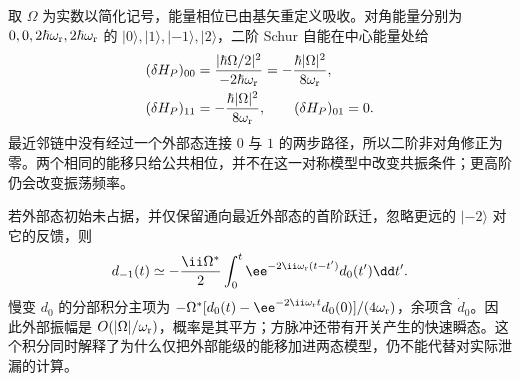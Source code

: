 \begin{derivation}[消去最近外部通道产生什么修正]
取 $\Omega$ 为实数以简化记号，能量相位已由基矢重定义吸收。对角能量分别为 $0,0,2\hbar\omega_{\rm r},2\hbar\omega_{\rm r}$ 的 $|0\rangle,|1\rangle,|-1\rangle,|2\rangle$，二阶 Schur 自能在中心能量处给
\begin{align*}
 (\delta H_P)_{00}&=\frac{|\hbar\Omega/2|^2}{-2\hbar\omega_{\rm r}}
 =-\frac{\hbar|\Omega|^2}{8\omega_{\rm r}},\\
 (\delta H_P)_{11}&=-\frac{\hbar|\Omega|^2}{8\omega_{\rm r}},\qquad
 (\delta H_P)_{01}=0.
\end{align*}
最近邻链中没有经过一个外部态连接 $0$ 与 $1$ 的两步路径，所以二阶非对角修正为零。两个相同的能移只给公共相位，并不在这一对称模型中改变共振条件；更高阶仍会改变振荡频率。

若外部态初始未占据，并仅保留通向最近外部态的首阶跃迁，忽略更远的 $|-2\rangle$ 对它的反馈，则
\begin{equation*}
 d_{-1}(t)\simeq-\frac{\ii\Omega^*}{2}\int_0^t
 \ee^{-2\ii\omega_{\rm r}(t-t')}d_0(t')\dd t'.
\end{equation*}
慢变 $d_0$ 的分部积分主项为
$-\Omega^*[d_0(t)-\ee^{-2\ii\omega_{\rm r}t}d_0(0)]/(4\omega_{\rm r})$，余项含 $\dot d_0$。因此外部振幅是 $O(|\Omega|/\omega_{\rm r})$，概率是其平方；方脉冲还带有开关产生的快速瞬态。这个积分同时解释了为什么仅把外部能级的能移加进两态模型，仍不能代替对实际泄漏的计算。
\end{derivation}








